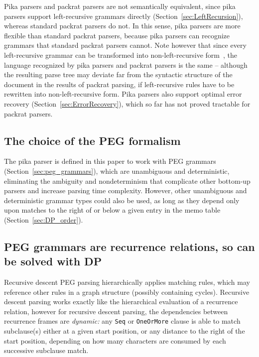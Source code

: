 \documentclass[manuscript,screen]{acmart}
\begin{document}
Pika parsers and packrat parsers are not semantically equivalent, since pika parsers support left-recursive grammars directly (Section~\ref{sec:LeftRecursion}), whereas standard packrat parsers do not. In this sense, pika parsers are more flexible than standard packrat parsers, because pika parsers can recognize grammars that standard packrat parsers cannot. Note however that since every left-recursive grammar can be transformed into non-left-recursive form~\citep{ford2002}, the language recognized by pika parsers and packrat parsers is the same -- although the resulting parse tree may deviate far from the syntactic structure of the document in the results of packrat parsing, if left-recursive rules have to be rewritten into non-left-recursive form. Pika parsers also support optimal error recovery (Section~\ref{sec:ErrorRecovery}), which so far has not proved tractable for packrat parsers.

\subsection{The choice of the PEG formalism}

The pika parser is defined in this paper to work with PEG grammars (Section~\ref{sec:peg_grammars}), which are unambiguous and deterministic, eliminating the ambiguity and nondeterminism that complicate other bottom-up parsers and increase parsing time complexity. However, other unambiguous and deterministic grammar types could also be used, as long as they depend only upon matches to the right of or below a given entry in the memo table (Section~\ref{sec:DP_order}).

\subsection{PEG grammars are recurrence relations, so can be solved with DP}

Recursive descent PEG parsing hierarchically applies matching rules, which may reference other rules in a graph structure (possibly containing cycles). Recursive descent parsing works exactly like the hierarchical evaluation of a recurrence relation, however for recursive descent parsing, the dependencies between recurrence frames are \emph{dynamic:} any \texttt{Seq} or \texttt{OneOrMore} clause is able to match subclause(s) either at a given start position, or any distance to the right of the start position, depending on how many characters are consumed by each successive subclause match.
\end{document}
